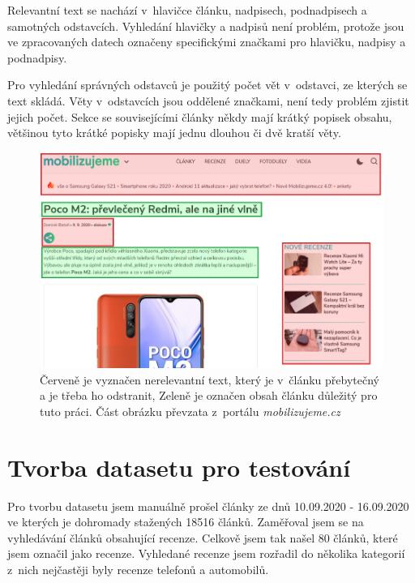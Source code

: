 Relevantní text se nachází v~hlavičce článku, nadpisech, podnadpisech a samotných odstavcích. Vyhledání hlavičky a nadpisů není problém, protože jsou ve zpracovaných datech označeny specifickými značkami pro hlavičku, nadpisy a podnadpisy.

Pro vyhledání správných odstavců je použitý počet vět v~odstavci, ze kterých se text skládá. Věty v~odstavcích jsou oddělené značkami, není tedy problém zjistit jejich počet. Sekce se souvisejícími články někdy mají krátký popisek obsahu, většinou tyto krátké popisky mají jednu dlouhou či dvě kratší věty.

\begin{figure}[h]
    \centering
    \includegraphics[scale=0.45]{obrazky-figures/ukazka_relevantniho_textu.png}
    \caption{Červeně je vyznačen nerelevantní text, který je v~článku přebytečný a je třeba ho odstranit, Zeleně je označen obsah článku důležitý pro tuto práci. Část obrázku převzata z~portálu \textit{mobilizujeme.cz}}
    \label{fig:relevantni_text}
\end{figure}


\section{Tvorba datasetu pro testování}

Pro tvorbu datasetu jsem manuálně prošel články ze dnů 10.09.2020 - 16.09.2020 ve kterých je dohromady stažených 18516 článků. Zaměřoval jsem se na vyhledávání článků obsahující recenze. Celkově jsem tak našel 80 článků, které jsem označil jako recenze. Vyhledané recenze jsem rozřadil do několika kategorií z~nich nejčastěji byly recenze telefonů a automobilů.


